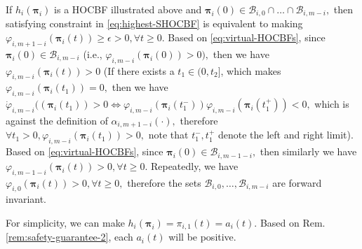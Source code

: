 \begin{remark}
\label{rem:safety-guarantee-2}
If $h_{i}(\boldsymbol{\pi}_{i})$ is a HOCBF illustrated above and $\boldsymbol{\pi}_{i}(0) \in \mathcal {B}_{i,0}\cap \dots \cap \mathcal {B}_{i,m-i},$ then satisfying constraint in \eqref{eq:highest-SHOCBF} is equivalent to making $\varphi_{i,m+1-i}(\boldsymbol{\pi}_{i}(t))\ge \epsilon>0, \forall t\ge 0.$ Based on
\eqref{eq:virtual-HOCBFs}, since $\boldsymbol{\pi}_{i}(0) \in \mathcal {B}_{i,m-i}$ (i.e., $\varphi_{i,m-i}(\boldsymbol{\pi}_{i}(0))>0),$ then we have $\varphi_{i,m-i}(\boldsymbol{\pi}_{i}(t))>0$ (If there exists a $t_{1}\in (0,t_{2}]$, which makes $\varphi_{i,m-i}(\boldsymbol{\pi}_{i}(t_{1}))=0,$ then we have $\dot{\varphi}_{i,m-i}((\boldsymbol{\pi}_{i}(t_{1}))>0\Leftrightarrow \varphi_{i,m-i}(\boldsymbol{\pi}_{i}(t_{1}^{-}))\varphi_{i,m-i}(\boldsymbol{\pi}_{i}(t_{1}^{+}))<0,$ which is against the definition of $\alpha_{i,m+1-i}(\cdot),$ therefore $\forall t_{1}>0, \varphi_{i,m-i}(\boldsymbol{\pi}_{i}(t_{1}))>0,$ note that $t_{1}^{-},t_{1}^{+}$ denote the left and right limit). Based on \eqref{eq:virtual-HOCBFs}, since $\boldsymbol{\pi}_{i}(0) \in \mathcal {B}_{i,m-1-i},$ then similarly we have $\varphi_{i,m-1-i}(\boldsymbol{\pi}_{i}(t))>0,\forall t\ge 0.$ Repeatedly, we have $\varphi_{i,0}(\boldsymbol{\pi}_{i}(t))>0,\forall t\ge 0,$ therefore the sets $\mathcal {B}_{i,0},\dots,\mathcal {B}_{i,m-i}$ are forward invariant.
\end{remark}

For simplicity, we can make $h_{i}(\boldsymbol{\pi}_{i})=\pi_{i,1}(t)=a_{i}(t).$ Based on Rem. \ref{rem:safety-guarantee-2}, each $a_{i}(t)$ will be positive.


